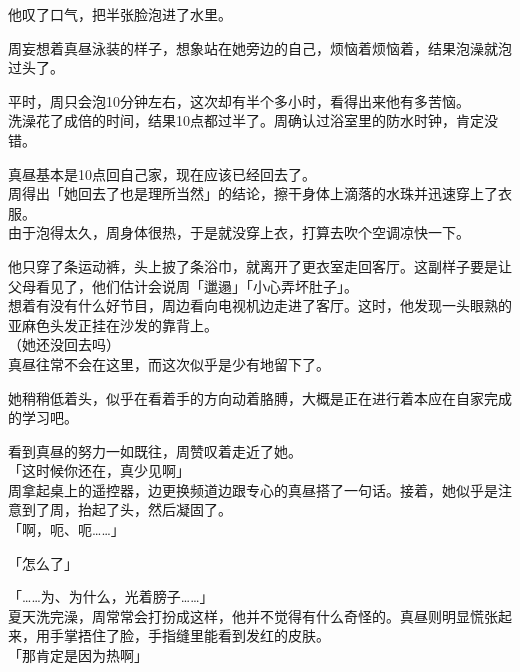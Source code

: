 他叹了口气，把半张脸泡进了水里。\\

\vspace{2\baselineskip}

周妄想着真昼泳装的样子，想象站在她旁边的自己，烦恼着烦恼着，结果泡澡就泡过头了。

平时，周只会泡10分钟左右，这次却有半个多小时，看得出来他有多苦恼。\\

洗澡花了成倍的时间，结果10点都过半了。周确认过浴室里的防水时钟，肯定没错。

真昼基本是10点回自己家，现在应该已经回去了。\\

周得出「她回去了也是理所当然」的结论，擦干身体上滴落的水珠并迅速穿上了衣服。\\

由于泡得太久，周身体很热，于是就没穿上衣，打算去吹个空调凉快一下。

他只穿了条运动裤，头上披了条浴巾，就离开了更衣室走回客厅。这副样子要是让父母看见了，他们估计会说周「邋遢」「小心弄坏肚子」。\\

想着有没有什么好节目，周边看向电视机边走进了客厅。这时，他发现一头眼熟的亚麻色头发正挂在沙发的靠背上。\\

（她还没回去吗）\\

真昼往常不会在这里，而这次似乎是少有地留下了。

她稍稍低着头，似乎在看着手的方向动着胳膊，大概是正在进行着本应在自家完成的学习吧。

看到真昼的努力一如既往，周赞叹着走近了她。\\

「这时候你还在，真少见啊」\\

周拿起桌上的遥控器，边更换频道边跟专心的真昼搭了一句话。接着，她似乎是注意到了周，抬起了头，然后凝固了。\\

「啊，呃、呃……」

「怎么了」

「……为、为什么，光着膀子……」\\

夏天洗完澡，周常常会打扮成这样，他并不觉得有什么奇怪的。真昼则明显慌张起来，用手掌捂住了脸，手指缝里能看到发红的皮肤。\\

「那肯定是因为热啊」


